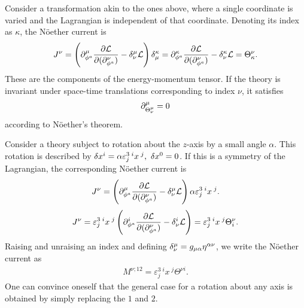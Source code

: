 Consider a transformation akin to the ones above, where a single coordinate is varied and the Lagrangian is independent of that coordinate. Denoting its index as $\kappa$, the Nöether current is
\begin{align*}
	J^{\nu} = \left(\del{\mu}{\phi^{a}}\pdv{\lag}{(\del{\nu}{\phi^{a}})} - \kdelta{\mu}{\nu}\lag\right)\kdelta{\kappa}{\mu} = \del{\kappa}{\phi^{a}}\pdv{\lag}{(\del{\nu}{\phi^{a}})} - \kdelta{\kappa}{\nu}\lag = \Theta_{\kappa}^{\nu}.
\end{align*}
These are the components of the energy-momentum tensor. If the theory is invariant under space-time translations corresponding to index $\nu$, it satisfies
\begin{align*}
	\partial^{\mu}_{\Theta_{\nu}^{\mu}} = 0
\end{align*}
according to Nöether's theorem.

Consider a theory subject to rotation about the $z$-axis by a small angle $\alpha$. This rotation is described by $\var{x^{i}} = \alpha\varepsilon^{3\;i}_{j}x^{\;j},\ \var{x^{0}} = 0$. If this is a symmetry of the Lagrangian, the corresponding Nöether current is
\begin{align*}
	J^{\nu} = \left(\del{\mu}{\phi^{a}}\pdv{\lag}{(\del{\nu}{\phi^{a}})} - \kdelta{\mu}{\nu}\lag\right) \alpha\varepsilon^{3\;i}_{j}x^{\;j}.
\end{align*}
\begin{align*}
	J^{\nu} = \varepsilon^{3\;i}_{j}x^{\;j}\left(\del{i}{\phi^{a}}\pdv{\lag}{(\del{\nu}{\phi^{a}})} - \kdelta{i}{\nu}\lag\right) = \varepsilon^{3\;i}_{j}x^{\;j}\Theta_{i}^{\nu}.
\end{align*}
Raising and unraising an index and defining $\kdelta{\mu}{\nu} = g_{\mu\alpha}\eta^{\alpha\nu}$, we write the Nöether current as
\begin{align*}
	M^{\nu;12} = \varepsilon^{3\;i}_{j}x^{\;j}\Theta^{\nu i}.
\end{align*}
One can convince oneself that the general case for a rotation about any axis is obtained by simply replacing the $1$ and $2$.


